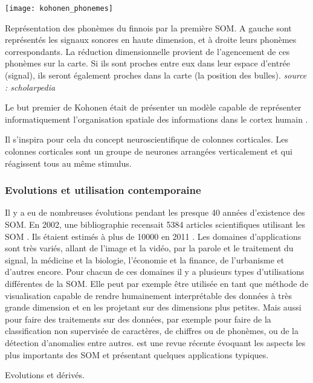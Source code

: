 	\begin{figureth}
		\texttt{[image: kohonen\_phonemes]}
		\caption[Phonème SOM]{Représentation des phonèmes du finnois par la première SOM. A gauche sont représentés les signaux sonores en haute dimension, et à droite leurs phonèmes correspondants. La réduction dimensionnelle provient de l'agencement de ces phonèmes sur la carte. Si ils sont proches entre eux dans leur espace d'entrée (signal), ils seront également proches dans la carte (la position des bulles). \textit{source : scholarpedia}}\label{fig:img:phonemes}

	\end{figureth}

	Le but premier de Kohonen était de présenter un modèle capable de représenter informatiquement l'organisation spatiale des informations dans le cortex humain \cite{kohonen-memory}. 
	
	Il s'inspira pour cela du concept neuroscientifique de colonnes corticales. Les colonnes corticales sont un groupe de neurones arrangées verticalement et qui réagissent tous au même stimulus.

\subsubsection{Evolutions et utilisation contemporaine}
	Il y a eu de nombreuses évolutions pendant les presque 40 années d'existence des SOM. En 2002, une bibliographie recensait 5384 articles scientifiques utilisant les SOM \cite{oja2003bibliography}. Ils étaient estimés à plus de 10000 en 2011 \cite{bilbiography-finuni}. Les domaines d'applications sont très variés, allant de l'image et la vidéo, par la parole et le traitement du signal, la médicine et la biologie, l'économie et la finance, de l'urbanisme et d'autres encore. Pour chacun de ces domaines il y a plusieurs types d'utilisations différentes de la SOM. Elle peut par exemple être utilisée en tant que méthode de visualisation capable de rendre humainement interprétable des données à très grande dimension et en les projetant sur des dimensions plus petites. Mais aussi pour faire des traitements sur des données, par exemple pour faire de la classification non supervisée de caractères, de chiffres ou de phonèmes, ou de la détection d'anomalies entre autres. \cite{cottrell2018self} est une revue récente évoquant les aspects les plus importants des SOM et présentant quelques applications typiques. 

	Evolutions et dérivés.

